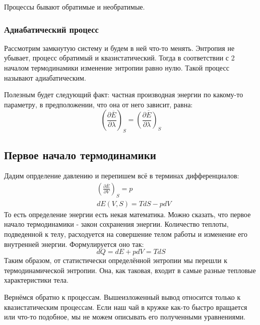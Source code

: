 \documentclass[a4paper, 12pt]{article}
\begin{document}
	Процессы бывают обратимые и необратимые.
	\subsubsection{Адиабатический процесс}
	Рассмотрим замкнутую систему и будем в ней что-то менять. Энтропия не убывает, процесс обратимый и квазистатический. Тогда в соответствии с 2 началом термодинамики изменение энтропии равно нулю. Такой процесс называют адиабатическим.
	
	
	Полезным будет следующий факт: частная производная энергии по какому-то параметру, в предположении, что она от него зависит, равна: 
	\begin{equation*}
		(\frac{\partial \overline{E}}{\partial \lambda} )_{S}= \overline{(\frac{\partial E}{\partial \lambda})_{S}}
	\end{equation*}
	\subsection{Первое начало термодинамики}
	Дадим опрделение давлению и перепишем всё в терминах дифференциалов:
	\begin{equation*}
		\begin{aligned}
			& (\frac{\partial \overline{E}}{\partial V} )_{S}= p \\
			& dE (V, S) = TdS -pdV                               
		\end{aligned}
	\end{equation*}
	То есть определение энергии есть некая математика. Можно сказать, что первое начало термодинамики - закон сохранения энергии. Количество теплоты, подведенной к телу, расходуется на совершение телом работы и изменение его внутренней энергии. 
	Формулируется оно так:
	\begin{equation*}
		dQ=dE+pdV=TdS
	\end{equation*}
	Таким образом, от статистически определённой энтропии мы перешли к термодинамической энтропии. Она, как таковая, входит в самые разные тепловые характеристики тела.
	
	Вернёмся обратно к процессам. Вышеизложенный вывод относится только к квазистатическим процессам. Если наш чай в кружке как-то быстро вращается или что-то подобное, мы не можем описывать его полученными уравнениями. 
\end{document}

